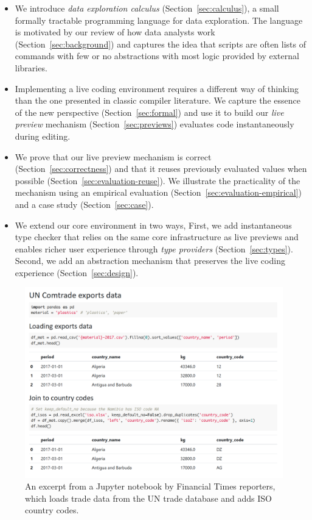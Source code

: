 \documentclass[acmsmall,anonymous,fleqn]{acmart}\settopmatter{printfolios=false,printccs=false,printacmref=false}
\theoremstyle{plain}
\theoremstyle{definition}
\begin{document}
\begin{itemize}[itemsep=3pt]
\item We introduce \emph{data exploration calculus} (Section~\ref{sec:calculus}), a small formally
  tractable programming language for data exploration. The language is motivated by our review
  of how data analysts work (Section~\ref{sec:background}) and captures the idea that scripts are
  often lists of commands with few or no abstractions with most logic provided by external libraries.

\item Implementing a live coding environment requires a different way of thinking than the one
  presented in classic compiler literature. We capture the essence of the new perspective
  (Section~\ref{sec:formal}) and use it to build our \emph{live preview} mechanism
  (Section~\ref{sec:previews}) evaluates code instantaneously during editing.

\item We prove that our live preview mechanism is correct (Section~\ref{sec:correctness}) and that
  it reuses previously evaluated values when possible (Section~\ref{sec:evaluation-reuse}). We
  illustrate the practicality of the mechanism using an empirical evaluation
  (Section~\ref{sec:evaluation-empirical}) and a case study (Section~\ref{sec:case}).

\item We extend our core environment in two ways, First, we add instantaneous type checker
  that relies on the same core infrastructure as live previews and enables richer user experience
  through \emph{type providers} (Section~\ref{sec:types}). Second, we add an abstraction mechanism
  that preserves the live coding experience (Section~\ref{sec:design}).
\end{itemize}


\begin{figure}[b]
\includegraphics[scale=0.5]{notebook.png}
\caption{An excerpt from a Jupyter notebook by Financial Times reporters, which loads trade
  data from the UN trade database and adds ISO country codes.}
\label{fig:ft-uncomtrade}
\end{figure}
\end{document}

